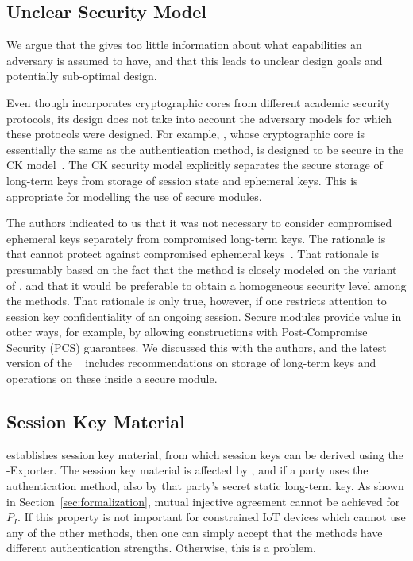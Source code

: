 \documentclass[runningheads]{llncs}
\begin{document}
\subsection{Unclear Security Model}
We argue that the \mSpec{} gives too little information about what capabilities
an adversary is assumed to have, and that this leads to unclear design goals and
potentially sub-optimal design.
%

Even though \mEdhoc{} incorporates cryptographic cores from different academic
security protocols, its design does not take into account the adversary models
for which these protocols were designed.
%
For example, \mOptls{}, whose cryptographic core is essentially the same
as the \mStat{} authentication method, is designed to be secure in the CK
model~\cite{DBLP:conf/crypto/CanettiK02}.
%
The CK security model explicitly separates the secure storage of long-term
keys from storage of session state and ephemeral keys.
%
This is appropriate for modelling the use of secure modules.
%

The \mEdhoc{} authors indicated to us that it was
not necessary to consider compromised ephemeral keys separately from
compromised long-term keys.
%
The rationale is that \mSigma{} cannot protect against compromised ephemeral
keys~\cite{personalCommunication}.
%
That rationale is presumably based on the fact that the \mSigSig{} method is
closely modeled on the \mSigmaI{} variant of \mSigma{}, and that it would be
preferable to obtain a homogeneous security level among the \mEdhoc{}
methods.
%
That rationale is only true, however, if one restricts attention to session key
confidentiality of an ongoing session.
%
Secure modules provide value in other ways, for example, by allowing
constructions with Post-Compromise Security (PCS) guarantees.
%
We discussed this with the authors, and
the latest version of the \mSpec{}~\cite{latest-ietf-lake-edhoc-05} includes
recommendations on storage of long-term keys and operations on these inside a
secure module.
%

\subsection{Session Key Material}
\label{sec:sessionKeyMaterial}
\mEdhoc{} establishes session key material, from which session keys
can be derived using the \mEdhoc{}-Exporter.
%
The session key material is affected by \mGxy{}, and if a party uses the
\mStat{} authentication method, also by that party's secret static long-term key.
%
As shown in Section~\ref{sec:formalization}, mutual injective agreement cannot
be achieved for $P_I$.
%
If this property is not important for constrained IoT devices which cannot use
any of the other methods, then one can simply accept that the methods have
different authentication strengths.
%
Otherwise, this is a problem.
%
\end{document}
